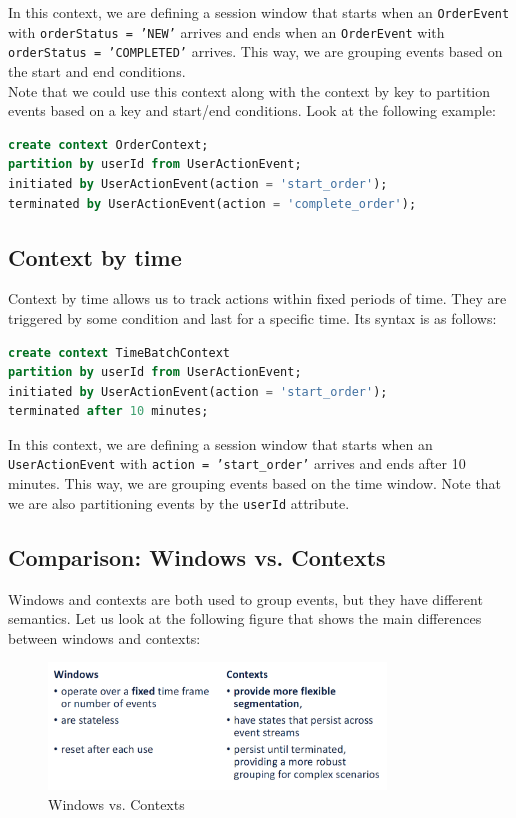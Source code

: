 In this context, we are defining a session window that starts when an \texttt{OrderEvent} with
\texttt{orderStatus = 'NEW'} arrives and ends when an \texttt{OrderEvent} with \texttt{orderStatus
= 'COMPLETED'} arrives. This way, we are grouping events based on the start and end conditions.\\

Note that we could use this context along with the context by key to partition events based on a key
and start/end conditions. Look at the following example:\\

\begin{lstlisting}[language=SQL]
create context OrderContext;
partition by userId from UserActionEvent;
initiated by UserActionEvent(action = 'start_order');
terminated by UserActionEvent(action = 'complete_order');
\end{lstlisting}

\subsection{Context by time}

Context by time allows us to track actions within fixed periods of time. They are triggered by some
condition and last for a specific time. Its syntax is as follows:\\

\begin{lstlisting}[language=SQL]
create context TimeBatchContext
partition by userId from UserActionEvent;
initiated by UserActionEvent(action = 'start_order');
terminated after 10 minutes;
\end{lstlisting}

In this context, we are defining a session window that starts when an \texttt{UserActionEvent} with
\texttt{action = 'start\_order'} arrives and ends after 10 minutes. This way, we are grouping events
based on the time window. Note that we are also partitioning events by the \texttt{userId} attribute.

\subsection{Comparison: Windows vs. Contexts}

Windows and contexts are both used to group events, but they have different semantics. Let us look
at the following figure that shows the main differences between windows and contexts:

\begin{figure}[H]
    \centering
    \includegraphics[width=0.8\textwidth]{figures/image_windows_vs_context.png}
    \caption{Windows vs. Contexts}
    \label{fig:windows_vs_contexts}
\end{figure}

